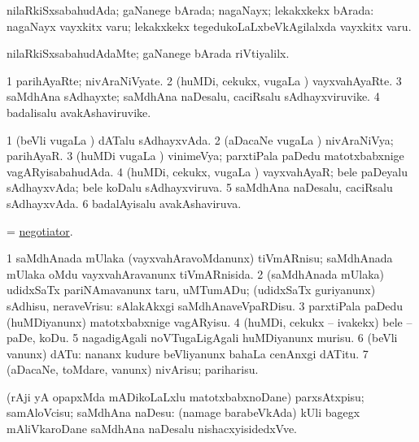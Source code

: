 \bentry
{}
\gl{\gu}
\bmng
nilaRkiSxsabahudAda; gaNanege bArada; nagaNayx; lekakxkekx bArada:  nagaNayx vayxkitx \mo varu; lekakxkekx tegedukoLaLxbeVkAgilalxda vayxkitx \mo varu. 
\emng
\eentry

\bentry
{}
\gl{\kirxvi}
\bmng
nilaRkiSxsabahudAdaMte; gaNanege bArada riVtiyalilx. 
\emng
\eentry

\bentry
{}
\gl{\nA}
\bmng
\bnum
\num{1} parihAyaRte; nivAraNiVyate. 
\num{2} (huMDi, cekukx, \mo vugaLa \vi) vayxvahAyaRte. 
\num{3} saMdhAna sAdhayxte; saMdhAna naDesalu, caciRsalu sAdhayxviruvike. 
\num{4} badalisalu avakAshaviruvike. 
\enum
\emng
\eentry

\bentry
{}
\gl{\gu}
\bmng
\bnum
\num{1} (beVli \mo vugaLa \vi) dATalu sAdhayxvAda. 
\num{2} (aDacaNe \mo vugaLa \vi) nivAraNiVya; parihAyaR. 
\num{3} (huMDi \mo vugaLa \vi) vinimeVya; parxtiPala paDedu matotxbabxnige vagARyisabahudAda. 
\num{4} (huMDi, cekukx, \mo vugaLa \vi) vayxvahAyaR; bele paDeyalu sAdhayxvAda; bele koDalu sAdhayxviruva. 
\num{5} saMdhAna naDesalu, caciRsalu sAdhayxvAda. 
\num{6} badalAyisalu avakAshaviruva. 
\enum
\emng
\eentry

\bentry
{}
\gl{\nA}
\bmng
= \hyperlink{negotiator}{negotiator}. 
\emng
\eentry

\bentry
{}
\gl{\sakirx}
\bmng
\bnum
\num{1} saMdhAnada mUlaka (vayxvahAravoMdanunx) tiVmARnisu;  saMdhAnada mUlaka oMdu vayxvahAravanunx tiVmARnisida. 
\num{2} (saMdhAnada mUlaka) udidxSaTx pariNAmavanunx taru, uMTumADu; (udidxSaTx guriyanunx) sAdhisu, neraveVrisu:  sAlakAkxgi saMdhAnaveVpaRDisu. 
\num{3} parxtiPala paDedu (huMDiyanunx) matotxbabxnige vagARyisu. 
\num{4} (huMDi, cekukx -- ivakekx) bele -- paDe, koDu. 
\num{5} nagadigAgali noVTugaLigAgali huMDiyanunx murisu. 
\num{6} (beVli \mo vanunx) dATu:  nananx kudure beVliyanunx bahaLa cenAnxgi dATitu. 
\num{7} (aDacaNe, toMdare, \mo vanunx) nivArisu; pariharisu. 
\enum
\emng

\noindent
\gl{\akirx}
\bmng
(rAji yA opapxMda mADikoLaLxlu matotxbabxnoDane) parxsAtxpisu; samAloVcisu; saMdhAna naDesu:  (namage barabeVkAda) kUli bagegx mAliVkaroDane saMdhAna naDesalu nishacxyisidedxVve. 
\emng
\eentry


